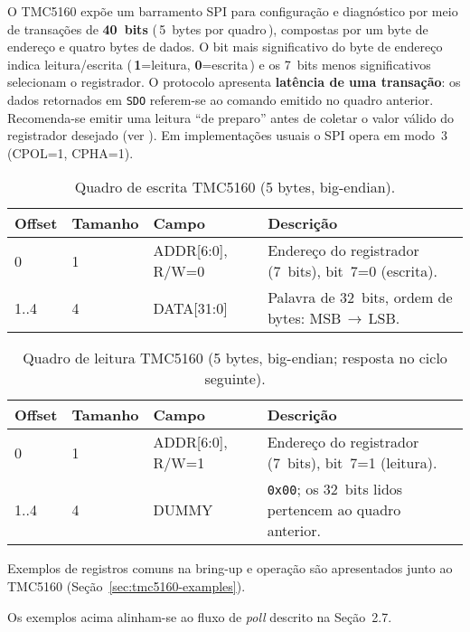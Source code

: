 O TMC5160 expõe um barramento SPI para configuração e diagnóstico por meio de
transações de \textbf{40~bits} (\,5~bytes por quadro\,), compostas por um byte de
endereço e quatro bytes de dados. O bit mais significativo do byte de endereço
indica leitura/escrita (\,\textbf{1}=leitura, \textbf{0}=escrita\,) e os 7~bits menos
significativos selecionam o registrador. O protocolo apresenta \textbf{latência de uma transação}:
os dados retornados em \texttt{SDO} referem-se ao comando emitido no quadro anterior.
Recomenda-se emitir uma leitura “de preparo” antes de coletar o valor válido do
registrador desejado (ver \cite{tmc5160_ds}). Em implementações usuais o SPI opera
em modo~3 (CPOL=1, CPHA=1).

\begin{table}[h]
  \centering
  \caption{Quadro de escrita TMC5160 (5 bytes, big-endian).}
  \label{tab:tmc5160-write}
  \setlength{\tabcolsep}{4pt}\footnotesize
  \begin{tabularx}{\textwidth}{lllX}
    \toprule
    Offset & Tamanho & Campo & Descrição \\
    \midrule
    0 & 1 & ADDR[6:0], R/W=0 & Endereço do registrador (7~bits), bit~7=0 (escrita). \\
    1..4 & 4 & DATA[31:0] & Palavra de 32~bits, ordem de bytes: MSB\,$\to$\,LSB. \\
    \bottomrule
  \end{tabularx}
\end{table}

\begin{table}[h]
  \centering
  \caption{Quadro de leitura TMC5160 (5 bytes, big-endian; resposta no ciclo seguinte).}
  \label{tab:tmc5160-read}
  \setlength{\tabcolsep}{4pt}\footnotesize
  \begin{tabularx}{\textwidth}{lllX}
    \toprule
    Offset & Tamanho & Campo & Descrição \\
    \midrule
    0 & 1 & ADDR[6:0], R/W=1 & Endereço do registrador (7~bits), bit~7=1 (leitura). \\
    1..4 & 4 & DUMMY & \texttt{0x00}; os 32~bits lidos pertencem ao quadro anterior. \\
    \bottomrule
  \end{tabularx}
\end{table}

\noindent Exemplos de registros comuns na bring-up e operação são apresentados
junto ao TMC5160 (Seção~\ref{sec:tmc5160-examples}).


Os exemplos acima alinham-se ao fluxo de \emph{poll} descrito na Seção~2.7.
